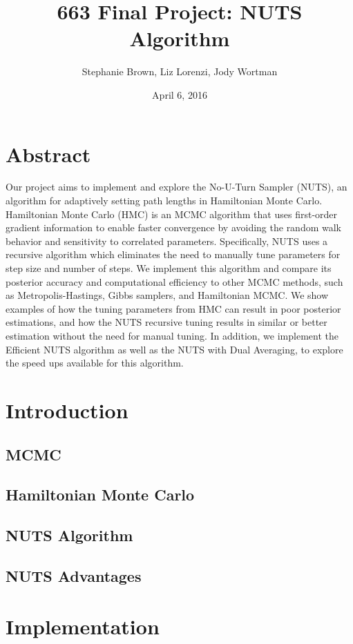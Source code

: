 \documentclass{article}
\title{663 Final Project: NUTS Algorithm}
\author{Stephanie Brown, Liz Lorenzi, Jody Wortman}
\date{April 6, 2016}
\begin{document}
\maketitle

\section*{Abstract}
Our project aims to implement and explore the No-U-Turn Sampler (NUTS), an algorithm for adaptively setting path lengths in Hamiltonian Monte Carlo. Hamiltonian Monte Carlo (HMC) is an MCMC algorithm that uses first-order gradient information to enable faster convergence by avoiding the random walk behavior and sensitivity to correlated parameters.  Specifically, NUTS uses a recursive algorithm which eliminates the need to manually tune parameters for step size and number of steps.  We implement this algorithm and compare its posterior accuracy and computational efficiency to other MCMC methods, such as Metropolis-Hastings, Gibbs samplers, and Hamiltonian MCMC. We show examples of how the tuning parameters from HMC can result in poor posterior estimations, and how the NUTS recursive tuning results in similar or better estimation without the need for manual tuning. In addition, we implement the Efficient NUTS algorithm as well as the NUTS with Dual Averaging, to explore the speed ups available for this algorithm.


\section{Introduction}
\subsection{MCMC}
\subsection{Hamiltonian Monte Carlo}
\subsection{NUTS Algorithm}
\subsection{NUTS Advantages}



\section{Implementation}
\end{document}
